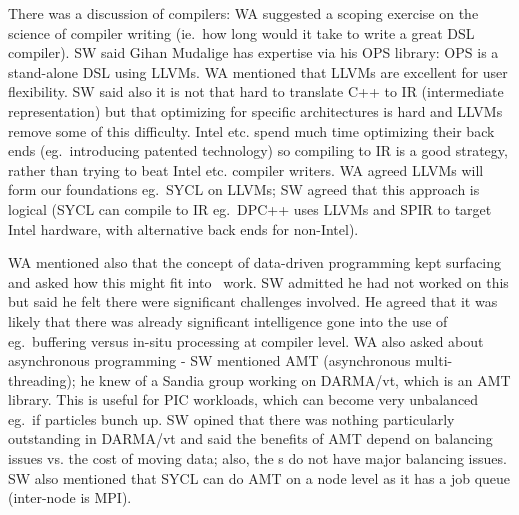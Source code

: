 There was a discussion of compilers: WA suggested a scoping 
exercise on the science of compiler writing (ie.\ how long would it take to 
write a great DSL compiler).  SW said Gihan Mudalige has expertise via his OPS 
library: OPS is a stand-alone DSL using LLVMs.  WA mentioned that LLVMs are 
excellent for user flexibility.  SW said also it is not that hard to translate 
C++ to IR (intermediate representation) but that optimizing for specific 
architectures is hard and LLVMs remove some of this difficulty.  Intel etc. 
spend much time optimizing their back ends (eg.\ introducing patented 
technology) so compiling to IR is a good strategy, rather than trying to beat 
Intel etc. compiler writers.  WA agreed LLVMs will form our foundations eg.\ 
SYCL on LLVMs; SW agreed that this approach is logical (SYCL can compile to IR 
eg.\ DPC++ uses LLVMs and SPIR to target Intel hardware, with alternative back 
ends for non-Intel).  

WA mentioned also that the concept 
of data-driven programming kept surfacing and asked how this might fit into 
\nep \   work.  SW admitted he had not worked on this but said he felt
there were significant challenges involved. He agreed that it was likely
that there was already significant intelligence gone into the use of eg.\ buffering
versus in-situ processing at compiler level.  WA also asked about 
asynchronous programming - SW mentioned AMT (asynchronous multi-threading); he 
knew of a Sandia group working on DARMA/vt, which is an AMT library.  This is 
useful for PIC workloads, which can become very unbalanced eg.\ if particles 
bunch up.  SW opined that there was nothing particularly outstanding in 
DARMA/vt and said the benefits of AMT depend on balancing issues vs. the cost 
of moving data; also, the \papp s do not have major balancing issues.  SW 
also mentioned that SYCL can do AMT on a node level as it has a job queue 
(inter-node is MPI).

